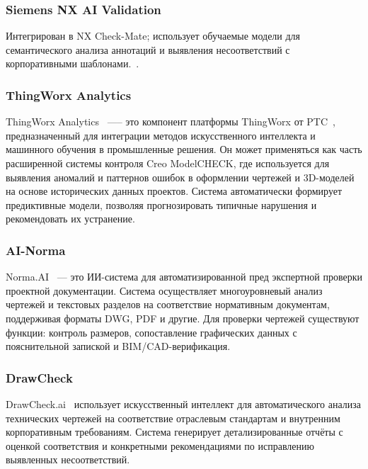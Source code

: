 \subsubsection{Siemens NX AI Validation} 

Интегрирован в NX Check-Mate; использует обучаемые модели для семантического анализа аннотаций и выявления несоответствий с корпоративными шаблонами.~\cite{nx-ai-validation}.

\subsubsection{ThingWorx Analytics}

ThingWorx Analytics~\cite{thing-worx} —-- это компонент платформы ThingWorx от PTC~\cite{creo-checker}, предназначенный для интеграции методов искусственного интеллекта и машинного обучения в промышленные решения. Он может применяться как часть расширенной системы контроля Creo ModelCHECK, где используется для выявления аномалий и паттернов ошибок в оформлении чертежей и 3D-моделей на основе исторических данных проектов. Система автоматически формирует предиктивные модели, позволяя прогнозировать типичные нарушения и рекомендовать их устранение. 

\subsubsection{AI-Norma}

Norma.AI~\cite{norma-ai} --- это ИИ-система для автоматизированной пред экспертной проверки проектной документации.
Система осуществляет многоуровневый анализ чертежей и текстовых разделов на соответствие нормативным документам, поддерживая форматы DWG, PDF и другие.
Для проверки чертежей существуют функции: контроль размеров, сопоставление графических данных с пояснительной запиской и BIM/CAD-верификация. 

\subsubsection{DrawCheck}

DrawCheck.ai~\cite{drawcheck-ai} использует искусственный интеллект для автоматического анализа технических чертежей на соответствие отраслевым стандартам и внутренним корпоративным требованиям.
Система генерирует детализированные отчёты с оценкой соответствия и конкретными рекомендациями по исправлению выявленных несоответствий.


